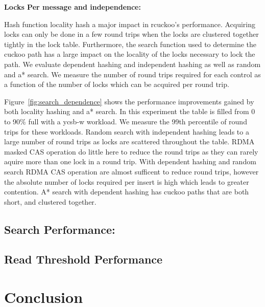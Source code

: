 \textbf{Locks Per message and independence:} 

Hash function locality hash a major impact in rcuckoo's
performance. Acquiring locks can only be done in a few round
trips when the locks are clustered together tightly in the
lock table. Furthermore, the search function used to
determine the cuckoo path has a large impact on the locality
of the locks necessary to lock the path. We evaluate
dependent hashing and independent hashing as well as random
and a* search. We measure the number of round trips required
for each control as a function of the number of locks which
can be acquired per round trip.

Figure~\ref{fig:search_dependence} shows the performance
improvements gained by both locality hashing and a* search.
In this experiment the table is filled from 0 to 90\% full
with a ycsb-w workload. We measure the 99th percentile of
round trips for these workloads. Random search with
independent hashing leads to a large number of round trips
as locks are scattered throughout the table. RDMA masked CAS
operation do little here to reduce the round trips as they
can rarely aquire more than one lock in a round trip. With
dependent hashing and random search RDMA CAS operation are
almost sufficent to reduce round trips, however the absolute
number of locks required per insert is high which leads to
greater contention. A* search with dependent hashing has
cuckoo paths that are both short, and clustered together.



\subsection{Search Performance:}



\subsection{Read Threshold Performance} 



\section{Conclusion}
\label{sec:conclusion}
